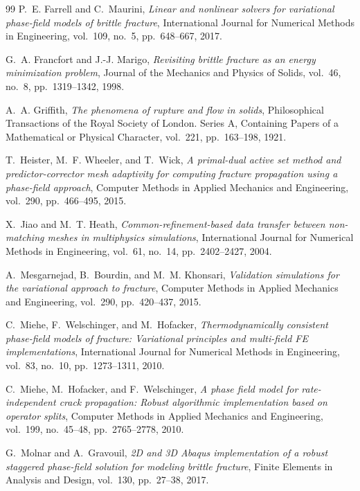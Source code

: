 \begin{thebibliography}{99}
P.~E. Farrell and C.~Maurini,
\textit{Linear and nonlinear solvers for variational phase-field models of brittle fracture},
International Journal for Numerical Methods in Engineering,
vol.~109, no.~5, pp.~648--667, 2017.

G.~A. Francfort and J.-J. Marigo,
\textit{Revisiting brittle fracture as an energy minimization problem},
Journal of the Mechanics and Physics of Solids,
vol.~46, no.~8, pp.~1319--1342, 1998.

A.~A. Griffith,
\textit{The phenomena of rupture and flow in solids},
Philosophical Transactions of the Royal Society of London. Series A, Containing Papers of a Mathematical or Physical Character,
vol.~221, pp.~163--198, 1921.

T.~Heister, M.~F. Wheeler, and T.~Wick,
\textit{A primal-dual active set method and predictor-corrector mesh adaptivity for computing fracture propagation using a phase-field approach},
Computer Methods in Applied Mechanics and Engineering,
vol.~290, pp.~466--495, 2015.

X.~Jiao and M.~T. Heath,
\textit{Common-refinement-based data transfer between non-matching meshes in multiphysics simulations},
International Journal for Numerical Methods in Engineering,
vol.~61, no.~14, pp.~2402--2427, 2004.

A.~Mesgarnejad, B.~Bourdin, and M.~M. Khonsari,
\textit{Validation simulations for the variational approach to fracture},
Computer Methods in Applied Mechanics and Engineering,
vol.~290, pp.~420--437, 2015.

C.~Miehe, F.~Welschinger, and M.~Hofacker,
\textit{Thermodynamically consistent phase-field models of fracture: Variational principles and multi-field FE implementations},
International Journal for Numerical Methods in Engineering,
vol.~83, no.~10, pp.~1273--1311, 2010.

C.~Miehe, M.~Hofacker, and F.~Welschinger,
\textit{A phase field model for rate-independent crack propagation: Robust algorithmic implementation based on operator splits},
Computer Methods in Applied Mechanics and Engineering,
vol.~199, no.~45--48, pp.~2765--2778, 2010.

G.~Molnar and A.~Gravouil,
\textit{2D and 3D Abaqus implementation of a robust staggered phase-field solution for modeling brittle fracture},
Finite Elements in Analysis and Design,
vol.~130, pp.~27--38, 2017.


\end{thebibliography}
